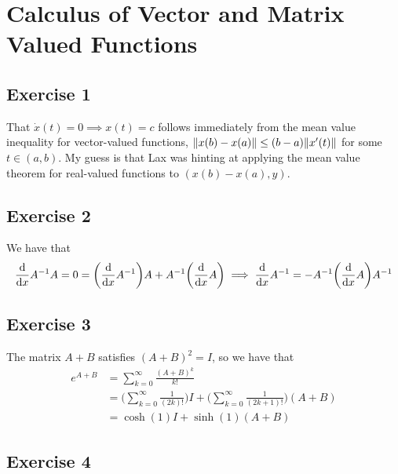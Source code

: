 \section{Calculus of Vector and Matrix Valued Functions}

\subsection{Exercise 1}
That $\dot{x}(t) = 0 \implies x(t) = c$ follows immediately from the mean value inequality for vector-valued
functions, $\norm{x(b) - x(a)} \leq (b - a) \norm{x'(t)}$ for some $t \in (a, b)$. My guess is that
Lax was hinting at applying the mean value theorem for real-valued functions to $(x(b) - x(a), y)$.

\subsection{Exercise 2}
We have that
\begin{align*}
        \dv{x} A^{-1} A = 0 = \bigg(\dv{x} A^{-1}\bigg) A + A^{-1} \bigg(\dv{x} A\bigg) \implies \dv{x} A^{-1} = -A^{-1} \bigg( \dv{x} A \bigg) A^{-1} 
\end{align*}

\subsection{Exercise 3}
The matrix $A + B$ satisfies $(A + B)^2 = I$, so we have that
\begin{align*}
        e^{A+B} &= \sum_{k = 0}^\infty \frac{(A + B)^k}{k!} \\
                &= \bigg(\sum_{k = 0}^\infty \frac{1}{(2k)!}\bigg) I +  \bigg(\sum_{k = 0}^\infty \frac{1}{(2k + 1)!}\bigg) (A + B) \\
                &= \cosh(1) I + \sinh(1) (A + B)
\end{align*}

\subsection{Exercise 4}

